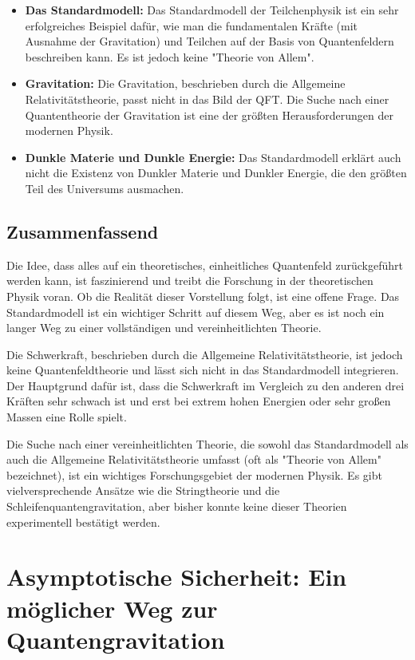 \documentclass{article}
\begin{document}
\begin{itemize}
	\item \textbf{Das Standardmodell:} Das Standardmodell der Teilchenphysik ist ein sehr erfolgreiches Beispiel dafür, wie man die fundamentalen Kräfte (mit Ausnahme der Gravitation) und Teilchen auf der Basis von Quantenfeldern beschreiben kann. Es ist jedoch keine "Theorie von Allem".
	\item \textbf{Gravitation:} Die Gravitation, beschrieben durch die Allgemeine Relativitätstheorie, passt nicht in das Bild der QFT. Die Suche nach einer Quantentheorie der Gravitation ist eine der größten Herausforderungen der modernen Physik.
	\item \textbf{Dunkle Materie und Dunkle Energie:} Das Standardmodell erklärt auch nicht die Existenz von Dunkler Materie und Dunkler Energie, die den größten Teil des Universums ausmachen.
\end{itemize}

\subsection{Zusammenfassend}

Die Idee, dass alles auf ein theoretisches, einheitliches Quantenfeld zurückgeführt werden kann, ist faszinierend und treibt die Forschung in der theoretischen Physik voran. Ob die Realität dieser Vorstellung folgt, ist eine offene Frage. Das Standardmodell ist ein wichtiger Schritt auf diesem Weg, aber es ist noch ein langer Weg zu einer vollständigen und vereinheitlichten Theorie.

Die Schwerkraft, beschrieben durch die Allgemeine Relativitätstheorie, ist jedoch keine Quantenfeldtheorie und lässt sich nicht in das Standardmodell integrieren. Der Hauptgrund dafür ist, dass die Schwerkraft im Vergleich zu den anderen drei Kräften sehr schwach ist und erst bei extrem hohen Energien oder sehr großen Massen eine Rolle spielt.

Die Suche nach einer vereinheitlichten Theorie, die sowohl das Standardmodell als auch die Allgemeine Relativitätstheorie umfasst (oft als "Theorie von Allem" bezeichnet), ist ein wichtiges Forschungsgebiet der modernen Physik. Es gibt vielversprechende Ansätze wie die Stringtheorie und die Schleifenquantengravitation, aber bisher konnte keine dieser Theorien experimentell bestätigt werden.

\section{Asymptotische Sicherheit: Ein möglicher Weg zur Quantengravitation}
\end{document}
